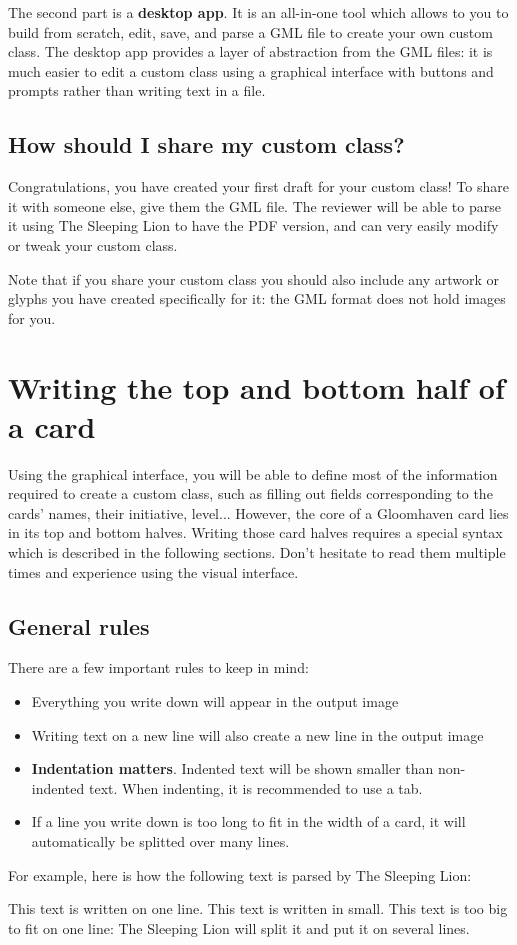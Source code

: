 \documentclass{article}
\begin{document}
The second part is a \textbf{desktop app}. It is an all-in-one tool which allows to you to build from scratch, edit, save, and parse a GML file to create your own custom class. The desktop app provides a layer of abstraction from the GML files: it is much easier to edit a custom class using a graphical interface with buttons and prompts rather than writing text in a file.

\subsection{How should I share my custom class?}
Congratulations, you have created your first draft for your custom class! To share it with someone else, give them the GML file. The reviewer will be able to parse it using The Sleeping Lion to have the PDF version, and can very easily modify or tweak your custom class.

Note that if you share your custom class you should also include any artwork or glyphs you have created specifically for it: the GML format does not hold images for you.

\section{Writing the top and bottom half of a card}
Using the graphical interface, you will be able to define most of the information required to create a custom class, such as filling out fields corresponding to the cards' names, their initiative, level... However, the core of a Gloomhaven card lies in its top and bottom halves. Writing those card halves requires a special syntax which is described in the following sections. Don't hesitate to read them multiple times and experience using the visual interface.

\subsection{General rules}
There are a few important rules to keep in mind:
\begin{itemize}
	\item Everything you write down will appear in the output image
	\item Writing text on a new line will also create a new line in the output image
	\item \textbf{Indentation matters}. Indented text will be shown smaller than non-indented text. When indenting, it is recommended to use a tab.
	\item If a line you write down is too long to fit in the width of a card, it will automatically be splitted over many lines.
\end{itemize}
For example, here is how the following text is parsed by The Sleeping Lion:
\begin{spverbatim}
	This text is written on one line.
    		This text is written in small.
	This text is too big to fit on one line: The Sleeping Lion will split it and put it on several lines.
\end{spverbatim}
\end{document}
